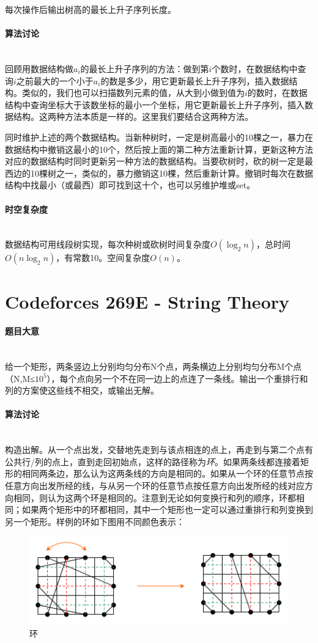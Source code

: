 \documentclass[UTF8]{ctexart}
\newcommand{\myparagraph}[1]{\paragraph{#1}\mbox{}\\}
\theoremstyle{nonumberplain}
\begin{document}
			每次操作后输出树高的最长上升子序列长度。
		
		\myparagraph{算法讨论}
		
			回顾用数据结构做${a_i}$的最长上升子序列的方法：做到第$i$个数时，在数据结构中查询$i$之前最大的一个小于$a_i$的数是多少，用它更新最长上升子序列，插入数据结构。类似的，我们也可以扫描数列元素的值，从大到小做到值为$i$的数时，在数据结构中查询坐标大于该数坐标的最小一个坐标，用它更新最长上升子序列，插入数据结构。这两种方法本质是一样的。这里我们要结合这两种方法。
			
			同时维护上述的两个数据结构。当新种树时，一定是树高最小的10棵之一，暴力在数据结构中撤销这最小的10个，然后按上面的第二种方法重新计算，更新这种方法对应的数据结构时同时更新另一种方法的数据结构。当要砍树时，砍的树一定是最西边的10棵树之一，类似的，暴力撤销这10棵，然后重新计算。撤销时每次在数据结构中找最小（或最西）即可找到这十个，也可以另维护堆或set。
		
		\myparagraph{时空复杂度}
		
			数据结构可用线段树实现，每次种树或砍树时间复杂度$O(\log_2n)$，总时间$O(n\log_2n)$，有常数10。空间复杂度$O(n)$。
	
	\section{Codeforces 269E - String Theory}
	
		\myparagraph{题目大意}
			
			给一个矩形，两条竖边上分别均匀分布N个点，两条横边上分别均匀分布M个点（N,M≤$10^5$），每个点向另一个不在同一边上的点连了一条线。输出一个重排行和列的方案使这些线不相交，或输出无解。
			
		\myparagraph{算法讨论}
		
			构造出解。从一个点出发，交替地先走到与该点相连的点上，再走到与第二个点有公共行/列的点上，直到走回初始点，这样的路径称为\emph{环}。如果两条线都连接着矩形的相同两条边，那么认为这两条线的方向是相同的。如果从一个环的任意节点按任意方向出发所经的线，与从另一个环的任意节点按任意方向出发所经的线对应方向相同，则认为这两个环是相同的。注意到无论如何变换行和列的顺序，环都相同；如果两个矩形中的环都相同，其中一个矩形也一定可以通过重排行和列变换到另一个矩形。样例的环如下图用不同颜色表示：
			
			\begin{figure}[ht]
				\centering
				\includegraphics[width=\textwidth]{fig269e_1.jpg}
				\caption{环}
			\end{figure}
			
\end{document}
